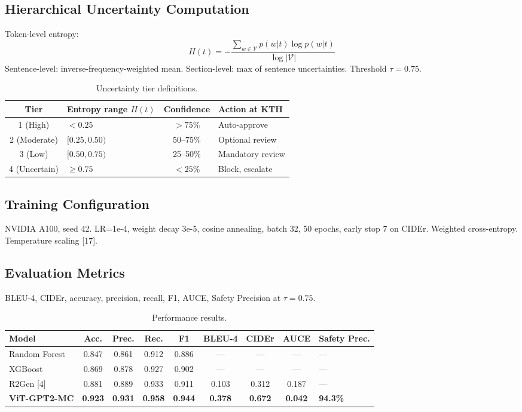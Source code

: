 \documentclass{jcst}
\begin{document}
\subsection{Hierarchical Uncertainty Computation}
Token-level entropy:
\begin{equation}
H(t) = -\frac{\sum_{w \in \mathcal{V}} p(w|t) \log p(w|t)}{\log |\mathcal{V}|}
\end{equation}
Sentence-level: inverse-frequency-weighted mean. Section-level: max of sentence uncertainties. Threshold \(\tau=0.75\).

\begin{table}[htbp]
\centering
\small
\caption{Uncertainty tier definitions.}
\label{tab:tiers}
\begin{tabular}{clcl}
\toprule
\textbf{Tier} & \textbf{Entropy range \(H(t)\)} & \textbf{Confidence} & \textbf{Action at KTH} \\
\midrule
1 (High) & \(<0.25\) & \(>75\%\) & Auto-approve \\
2 (Moderate) & \([0.25,0.50)\) & 50–75\% & Optional review \\
3 (Low) & \([0.50,0.75)\) & 25–50\% & Mandatory review \\
4 (Uncertain) & \(\ge 0.75\) & \(<25\%\) & Block, escalate \\
\bottomrule
\end{tabular}
\end{table}

\subsection{Training Configuration}
NVIDIA A100, seed 42. LR=1e-4, weight decay 3e-5, cosine annealing, batch 32, 50 epochs, early stop 7 on CIDEr. Weighted cross-entropy. Temperature scaling [17].

\subsection{Evaluation Metrics}
BLEU-4, CIDEr, accuracy, precision, recall, F1, AUCE, Safety Precision at \(\tau=0.75\).

\begin{table}[htbp]
\centering
\footnotesize
\caption{Performance results.}
\label{tab:results}
\begin{tabular}{lccccccc}
\toprule
\textbf{Model} & \textbf{Acc.} & \textbf{Prec.} & \textbf{Rec.} & \textbf{F1} & \textbf{BLEU-4} & \textbf{CIDEr} & \textbf{AUCE} & \textbf{Safety Prec.} \\
\midrule
Random Forest & 0.847 & 0.861 & 0.912 & 0.886 & — & — & — & — \\
XGBoost & 0.869 & 0.878 & 0.927 & 0.902 & — & — & — & — \\
R2Gen [4] & 0.881 & 0.889 & 0.933 & 0.911 & 0.103 & 0.312 & 0.187 & — \\
\textbf{ViT-GPT2-MC} & \textbf{0.923} & \textbf{0.931} & \textbf{0.958} & \textbf{0.944} & \textbf{0.378} & \textbf{0.672} & \textbf{0.042} & \textbf{94.3\%} \\
\bottomrule
\end{tabular}
\end{table}
\end{document}
